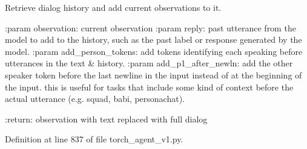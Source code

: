 \begin{DoxyVerb}Retrieve dialog history and add current observations to it.

:param observation:        current observation
:param reply:              past utterance from the model to add to the
                   history, such as the past label or response
                   generated by the model.
:param add_person_tokens:  add tokens identifying each speaking before
                   utterances in the text & history.
:param add_p1_after_newln: add the other speaker token before the last
                   newline in the input instead of at the
                   beginning of the input. this is useful for
                   tasks that include some kind of context
                   before the actual utterance (e.g. squad,
                   babi, personachat).

:return: observation with text replaced with full dialog
\end{DoxyVerb}
 

Definition at line 837 of file torch\+\_\+agent\+\_\+v1.\+py.


